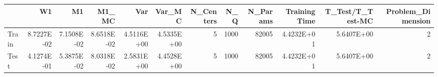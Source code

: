\begin{tabular}{lrrrrrrrrrrr}
\toprule
{} &         W1 &         M1 &      M1\_MC &        Var &     Var\_MC &  N\_Centers &   N\_Q &  N\_Params &  Training Time &  T\_Test/T\_Test-MC &  Problem\_Dimension \\
\midrule
Train & 8.7227E-02 & 7.1508E-02 & 8.6518E-02 & 4.5116E+00 & 4.5335E+00 &          5 &  1000 &     82005 &     4.4232E+01 &        5.6407E+00 &                  2 \\
Test  & 4.1274E-01 & 5.3875E-02 & 8.0318E-02 & 2.5831E+00 & 4.4528E+00 &          5 &  1000 &     82005 &     4.4232E+01 &        5.6407E+00 &                  2 \\
\bottomrule
\end{tabular}
